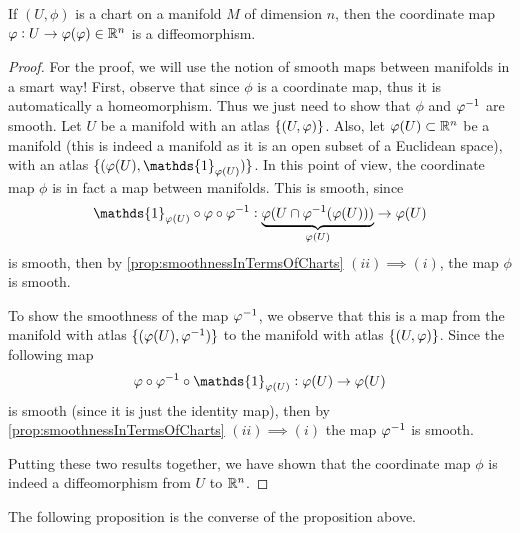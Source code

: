 \begin{proposition}
	If $ (U,\phi) $ is a chart on a manifold $ M $ of dimension $ n $, then the coordinate map $ \varphi:U\to\varphi(\varphi) \in \mathbb{R}^n$ is a diffeomorphism.
\end{proposition}
\begin{proof}
	For the proof, we will use the notion of smooth maps between manifolds in a smart way! First, observe that since $ \phi $ is a coordinate map, thus it is automatically a homeomorphism. Thus we just need to show that $ \phi $ and $ \varphi^{-1} $ are smooth. Let $ U $ be a manifold with an atlas $ \{(U,\varphi)\} $. Also, let $ \varphi(U) \subset\mathbb{R}^n $ be a manifold (this is indeed a manifold as it is an open subset of a Euclidean space), with an atlas $ \set{(\phi(U),\mathds{1}_{\phi(U)})} $. In this point of view, the coordinate map $ \phi $ is in fact a map between manifolds. This is smooth, since 
	\[ \mathds{1}_{\phi(U)}\circ \phi\circ \inv{\phi}: \underbrace{\phi(U \cap \inv{\phi}(\phi(U)))}_{\phi(U)} \to \phi(U) \]
	is smooth, then by \autoref{prop:smoothnessInTermsOfCharts} $ (ii) \implies (i) $, the map $ \phi $ is smooth.
	
	To show the smoothness of the map $ \varphi^{-1} $, we observe that this is a map from the manifold with atlas $ \{(\varphi(U),\varphi^{-1})\} $ to the manifold with atlas $ \{(U,\varphi)\} $. Since the following map
	\[ \phi \circ \inv{\phi} \circ \mathds{1}_{\phi(U)}: \phi(U) \to \phi(U) \]
	is smooth (since it is just the identity map), then by \autoref{prop:smoothnessInTermsOfCharts} $ (ii) \implies (i) $ the map $ \varphi^{-1} $ is smooth.
	
	Putting these two results together, we have shown that the coordinate map $ \phi $ is indeed a diffeomorphism from $ U $ to $ \mathbb{R}^n $.
\end{proof}


The following proposition is the converse of the proposition above.

